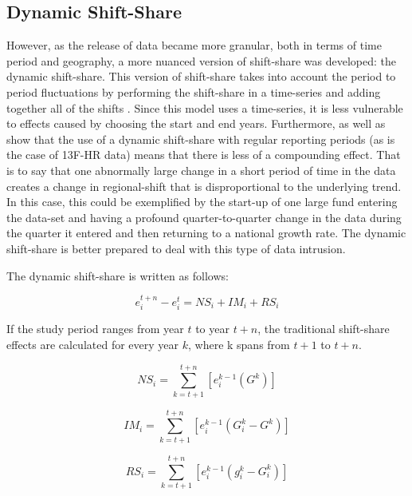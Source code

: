 \subsection{Dynamic Shift-Share}

However, as the release of data became more granular, both in terms of time period and geography, a more nuanced version of shift-share was developed: the dynamic shift-share.  This version of shift-share takes into account the period to period fluctuations by performing the shift-share in a time-series and adding together all of the shifts \citep{BarffKnight88}.  Since this model uses a time-series, it is less vulnerable to effects caused by choosing the start and end years. Furthermore, \cite{BarffKnight88} as well as \cite{harris1994dynamic} show that the use of a dynamic shift-share with regular reporting periods (as is the case of 13F-HR data) means that there is less of a compounding effect. That is to say that one abnormally large change in a short period of time in the data creates a change in regional-shift that is disproportional to the underlying trend. In this case, this could be exemplified by the start-up of one large fund entering the data-set and having a profound quarter-to-quarter change in the data during the quarter it entered and then returning to a national growth rate.  The dynamic shift-share is better prepared to deal with this type of data intrusion.  

The dynamic shift-share is written as follows:

\begin{equation}
    e^{t+n}_{i} - e^{t}_{i} = NS_{i} + IM_{i} + RS_{i}
\end{equation}

If the study period ranges from year $t$ to year $t+n$, the traditional shift-share effects are calculated for every year $k$, where k spans from $t+1$ to $t+n$. 

\begin{equation}
    NS_{i} = \sum_{k=t+1}^{t+n}[e^{k-1}_{i}(G^{k})]
    \label{Eq:NationalShare_dynamic}
\end{equation}

\begin{equation}
    IM_{i} = \sum_{k=t+1}^{t+n}[e^{k-1}_i(G^{k}_{i}-G^{k})]
     \label{Eq:IndustryMix_dynamic}
\end{equation}

\begin{equation}
    RS_{i} = \sum_{k=t+1}^{t+n}[e^{k-1}_i(g^{k}_{i} - G^{k}_{i} )]
        \label{Eq:RegionalShare_dynamic}
\end{equation}

